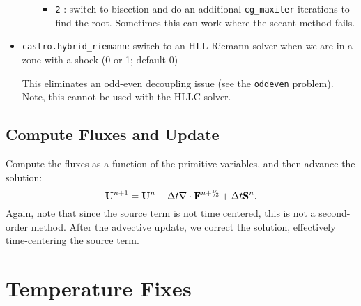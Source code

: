\begin{itemize}
\begin{itemize}
\begin{itemize}
     \item {\tt 2} : switch to bisection and do an additional {\tt cg\_maxiter}
       iterations to find the root.  Sometimes this can work where the 
       secant method fails.
     \end{itemize}
  \end{itemize}

\item {\tt castro.hybrid\_riemann}: switch to an HLL Riemann solver when we are
  in a zone with a shock (0 or 1; default 0)

  This eliminates an odd-even decoupling issue (see the {\tt oddeven}
  problem).  Note, this cannot be used with the HLLC solver.
  
\end{itemize}




\subsection{Compute Fluxes and Update}

Compute the fluxes as a function of the primitive variables, and then
advance the solution:
\begin{equation}
\Ub^{n+1} = \Ub^n - \dt\nabla\cdot\Fb^\nph + \dt\Sb^n.
\end{equation}
Again, note that since the source term is not time centered, this is
not a second-order method.  After the advective update, we correct the
solution, effectively time-centering the source term.


\section{Temperature Fixes}

